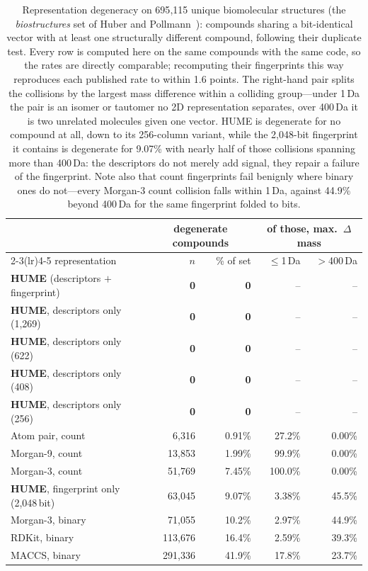 \begin{table}[t]
\centering
\begin{tabular}{lrrrr}
\toprule
& \multicolumn{2}{c}{degenerate compounds} & \multicolumn{2}{c}{of those, max.\ $\Delta$mass} \\
\cmidrule(lr){2-3}\cmidrule(lr){4-5}
representation & $n$ & \% of set & $\leq$1\,Da & $>$400\,Da \\
\midrule
\textbf{HUME} (descriptors $+$ fingerprint) & \textbf{0} & \textbf{0} & -- & -- \\
\textbf{HUME}, descriptors only (1{,}269) & \textbf{0} & \textbf{0} & -- & -- \\
\textbf{HUME}, descriptors only (622) & \textbf{0} & \textbf{0} & -- & -- \\
\textbf{HUME}, descriptors only (408) & \textbf{0} & \textbf{0} & -- & -- \\
\textbf{HUME}, descriptors only (256) & \textbf{0} & \textbf{0} & -- & -- \\
Atom pair, count & 6{,}316 & 0.91\% & 27.2\% & 0.00\% \\
Morgan-9, count & 13{,}853 & 1.99\% & 99.9\% & 0.00\% \\
Morgan-3, count & 51{,}769 & 7.45\% & 100.0\% & 0.00\% \\
\textbf{HUME}, fingerprint only (2{,}048\,bit) & 63{,}045 & 9.07\% & 3.38\% & 45.5\% \\
Morgan-3, binary & 71{,}055 & 10.2\% & 2.97\% & 44.9\% \\
RDKit, binary & 113{,}676 & 16.4\% & 2.59\% & 39.3\% \\
MACCS, binary & 291{,}336 & 41.9\% & 17.8\% & 23.7\% \\
\bottomrule
\end{tabular}
\caption{Representation degeneracy on 695{,}115 unique biomolecular structures
(the \emph{biostructures} set of Huber and Pollmann~\cite{Huber2026}): compounds sharing a
bit-identical vector with at least one structurally different compound, following their
duplicate test. Every row is computed here on the same compounds with the same code, so the
rates are directly comparable; recomputing their fingerprints this way reproduces each
published rate to within 1.6 points. The right-hand pair splits the collisions by the
largest mass difference within a colliding group---under 1\,Da the pair is an isomer or
tautomer no 2D representation separates, over 400\,Da it is two unrelated molecules given
one vector. HUME is degenerate for no compound at all, down to its 256-column variant,
while the 2{,}048-bit fingerprint it contains is degenerate for 9.07\% with nearly half of
those collisions spanning more than 400\,Da: the descriptors do not merely add signal, they
repair a failure of the fingerprint. Note also that count fingerprints fail benignly where
binary ones do not---every Morgan-3 count collision falls within 1\,Da, against 44.9\%
beyond 400\,Da for the same fingerprint folded to bits.}
\label{tab:degeneracy}
\end{table}
